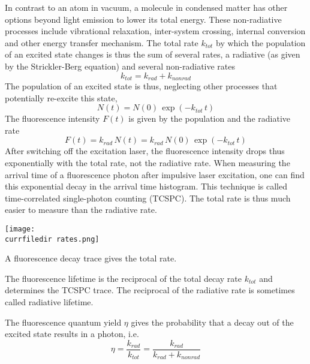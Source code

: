 In contrast to an atom in vacuum, a molecule in condensed matter has other options beyond light emission to lower its total energy. These non-radiative processes include vibrational relaxation, inter-system crossing, internal conversion and other energy transfer mechanism. The total rate $k_{tot}$ by which the population of an excited state changes is thus the sum of several rates, a radiative  (as given by the Strickler-Berg equation) and several non-radiative rates 
\begin{equation}
 k_{tot} = k_{rad} + k_{non rad} 
\end{equation}
%
The population of an excited state is thus, neglecting other processes that  potentially re-excite this state,
\begin{equation}
 N(t) = N(0) \, \exp \left( - k_{tot}  \,t \right)
\end{equation}
The fluorescence intensity $F(t)$ is given by the population and the radiative rate
\begin{equation}
 F(t) = k_{rad} \, N(t) = k_{rad} \,  N(0) \, \exp \left( - k_{tot} \, t \right)
\end{equation}
After switching off the excitation laser, the fluorescence intensity drops thus exponentially with the total rate, not the radiative rate. When measuring the arrival time of a fluorescence photon after impulsive laser excitation, one can find this exponential decay in the arrival time histogram. This technique is called time-correlated single-photon counting (TCSPC). The total rate is thus much easier to measure than the radiative rate. 


\begin{marginfigure}
   \texttt{[image: \\currfiledir rates.png]}
  \caption{A fluorescence decay trace gives the total rate.}
\end{marginfigure}


The fluorescence lifetime is the reciprocal of the total decay rate $k_{tot}$ and determines the TCSPC trace. The reciprocal of the radiative rate is sometimes called radiative lifetime.

The fluorescence quantum yield $\eta$ gives the probability that a decay out of the excited state results in a photon, i.e.
\begin{equation}
 \eta   = \frac{k_{rad}}{k_{tot}} = \frac{k_{rad}}{k_{rad} + k_{non rad}}
\end{equation}














\printbibliography[segment=\therefsegment,heading=subbibliography]
